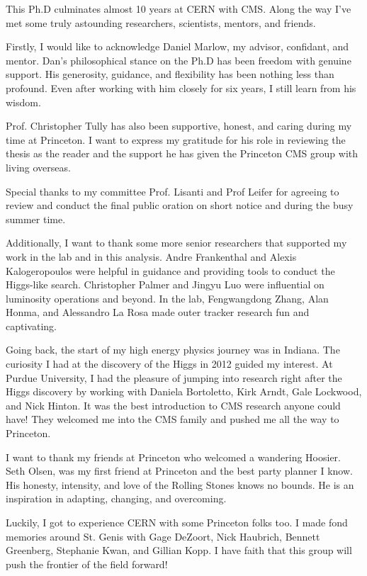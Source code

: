 This Ph.D culminates almost 10 years at CERN with CMS. Along the way I've met some truly astounding researchers, scientists, mentors, and friends.  

Firstly, I would like to acknowledge Daniel Marlow, my advisor, confidant, and mentor. Dan's philosophical stance on the Ph.D has been freedom with genuine support. His generosity, guidance, and flexibility has been nothing less than profound. Even after working with him closely for six years, I still learn from his wisdom. 

Prof. Christopher Tully has also been supportive, honest, and caring during my time at Princeton. I want to express my gratitude for his role in reviewing the thesis as the reader and the support he has given the Princeton CMS group with living overseas. 

Special thanks to my committee Prof. Lisanti and Prof Leifer for agreeing to review and conduct the final public oration on short notice and during the busy summer time.  

Additionally, I want to thank some more senior researchers that supported my work in the lab and in this analysis. Andre Frankenthal and Alexis Kalogeropoulos were helpful in guidance and providing tools to conduct the Higgs-like search. Christopher Palmer and Jingyu Luo were influential on luminosity operations and beyond. In the lab, Fengwangdong Zhang, Alan Honma, and Alessandro La Rosa made outer tracker research fun and captivating. 

Going back, the start of my high energy physics journey was in Indiana. The curiosity I had at the discovery of the Higgs in 2012 guided my interest. At Purdue University, I had the pleasure of jumping into research right after the Higgs discovery by working with Daniela Bortoletto, Kirk Arndt, Gale Lockwood, and Nick Hinton. It was the best introduction to CMS research anyone could have! They welcomed me into the CMS family and pushed me all the way to Princeton. 

I want to thank my friends at Princeton who welcomed a wandering Hoosier. Seth Olsen, was my first friend at Princeton and the best party planner I know. His honesty, intensity, and love of the Rolling Stones knows no bounds. He is an inspiration in adapting, changing, and overcoming. 

Luckily, I got to experience CERN with some Princeton folks too. I made fond memories around St. Genis with Gage DeZoort, Nick Haubrich, Bennett Greenberg, Stephanie Kwan, and Gillian Kopp. I have faith that this group will push the frontier of the field forward! 

